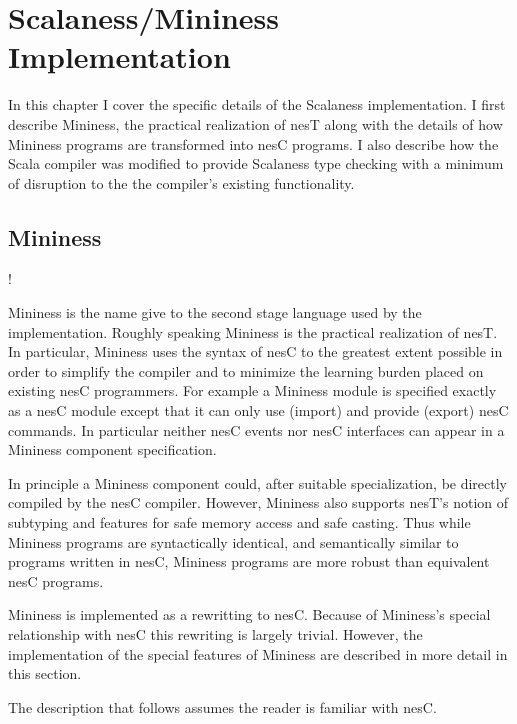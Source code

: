 \chapter{Scalaness/Mininess Implementation}
\label{chapter-scalaness-mininess-implementation}

In this chapter I cover the specific details of the Scalaness implementation. I first describe
Mininess, the practical realization of nesT along with the details of how Mininess programs are
transformed into nesC programs. I also describe how the Scala compiler was modified to provide
Scalaness type checking with a minimum of disruption to the the compiler's existing
functionality.

\section{Mininess}
\label{section-mininess-implementation}

\lstset{language=nesC}
\lstMakeShortInline!


Mininess is the name give to the second stage language used by the implementation. Roughly
speaking Mininess is the practical realization of nesT. In particular, Mininess uses the syntax
of nesC to the greatest extent possible in order to simplify the compiler and to minimize the
learning burden placed on existing nesC programmers. For example a Mininess module is specified
exactly as a nesC module except that it can only use (import) and provide (export) nesC
commands. In particular neither nesC events nor nesC interfaces can appear in a Mininess
component specification.

In principle a Mininess component could, after suitable specialization, be directly compiled by
the nesC compiler. However, Mininess also supports nesT's notion of subtyping and features for
safe memory access and safe casting. Thus while Mininess programs are syntactically identical,
and semantically similar to programs written in nesC, Mininess programs are more robust than
equivalent nesC programs.

Mininess is implemented as a rewritting to nesC. Because of Mininess's special relationship with
nesC this rewriting is largely trivial. However, the implementation of the special features of
Mininess are described in more detail in this section.

The description that follows assumes the reader is familiar with nesC.

